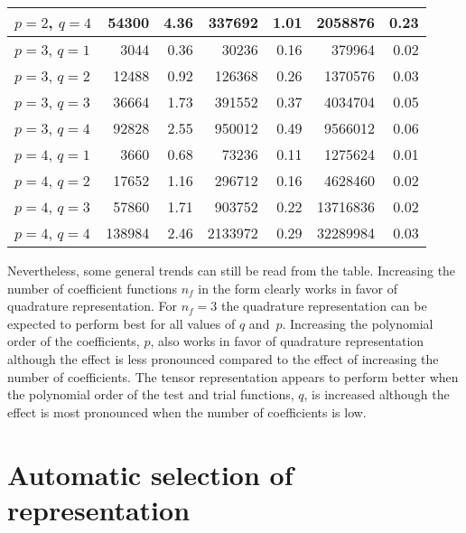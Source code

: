 \begin{table}
\begin{center}
\begin{tabular}{l|rr|rr|rr}
      $p = 2$, $q = 4$  &  54300  &  4.36               &  337692 &  1.01               & 2058876 & 0.23\\
      \hline
      $p = 3$, $q = 1$  &   3044  &  0.36               &   30236 &  0.16               &  379964 & 0.02\\
      $p = 3$, $q = 2$  &  12488  &  0.92               &  126368 &  0.26               & 1370576 & 0.03\\
      $p = 3$, $q = 3$  &  36664  &  1.73               &  391552 &  0.37               & 4034704 & 0.05\\
      $p = 3$, $q = 4$  &  92828  &  2.55               &  950012 &  0.49               & 9566012 & 0.06\\
      \hline
      $p = 4$, $q = 1$  &   3660  &  0.68               &   73236 &  0.11               & 1275624 & 0.01\\
      $p = 4$, $q = 2$  &  17652  &  1.16               &  296712 &  0.16               & 4628460 & 0.02\\
      $p = 4$, $q = 3$  &  57860  &  1.71               &  903752 &  0.22               &13716836 & 0.02\\
      $p = 4$, $q = 4$  & 138984  &  2.46               & 2133972 &  0.29               &32289984 & 0.03
    \end{tabular}
  \end{center}
\end{table}

Nevertheless, some general trends can still be read from the table.
Increasing the number of coefficient functions $n_f$ in the form
clearly works in favor of quadrature representation.  For $n_{f}=3$
the quadrature representation can be expected to perform best for all
values of $q$ and~$p$.  Increasing the polynomial order of
the coefficients, $p$, also works in favor of quadrature representation
although the effect is less pronounced compared to the effect of
increasing the number of coefficients.  The tensor representation
appears to perform better when the polynomial order of the test and
trial functions, $q$, is increased although the effect is most
pronounced when the number of coefficients is low.

\section{Automatic selection of representation}

